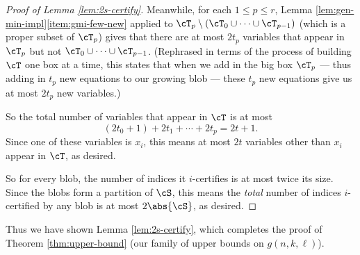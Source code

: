 \begin{proof}[Proof of Lemma \ref{lem:2s-certify}]
    Meanwhile, for each $1 \leq p \leq r$, Lemma \ref{lem:gen-min-impl}\ref{item:gmi-few-new} applied to $\cT_p \setminus (\cT_0 \cup \cdots \cup \cT_{p - 1})$ (which is a proper subset of $\cT_p$) gives that there are at most $2t_p$ variables that appear in $\cT_p$ but not $\cT_0 \cup \cdots \cup \cT_{p - 1}$. (Rephrased in terms of the process of building $\cT$ one box at a time, this states that when we add in the big box $\cT_p$ --- thus adding in $t_p$ new equations to our growing blob --- these $t_p$ new equations give us at most $2t_p$ new variables.) 
    
    So the total number of variables that appear in $\cT$ is at most \[(2t_0 + 1) + 2t_1 + \cdots + 2t_p = 2t + 1.\] Since one of these variables is $x_i$, this means at most $2t$ variables other than $x_i$ appear in $\cT$, as desired. 

    So for every blob, the number of indices it $i$-certifies is at most twice its size. Since the blobs form a partition of $\cS$, this means the \emph{total} number of indices $i$-certified by any blob is at most $2\abs{\cS}$, as desired. 
\end{proof}

Thus we have shown Lemma \ref{lem:2s-certify}, which completes the proof of Theorem \ref{thm:upper-bound} (our family of upper bounds on $g(n, k, \ell)$).  
